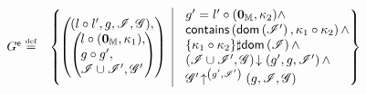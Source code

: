 %
%
%
\begin{definition}[Guarantee]
\[
\begin{array}{r l}

	\extendG \eqdef &
 	\left\{
 	\hspace*{-0.2cm}
	 \begin{array}{l | r}
	   \left(
	   \hspace*{-0.2cm}
	   \begin{array}{l}
	     (l \composeL l', g, \lmod, \gmod),\\
 	     \left(
	     \hspace*{-0.2cm}
	     \begin{array}{l}
	      l \composeL (\unitH, \ca{1}),\\
	      g \composeL g',\\
	      \lmod \cup \lmod', \gmod'
	     \end{array}
 	    \hspace*{-0.2cm}
 	    \right)
	   \end{array}
	   \hspace*{-0.2cm}
 	  \right)
	   &
 	  \begin{array}{l}
 	  	g' = l' \composeL (\unitH, \ca{2})  \land\\
 	  	\contains{\dom{\lmod'}}{\ca{1} \composeL \ca{2}} \land\\ 	  	
 	  	\{\ca{1} \composeL \ca{2}\} \disjoint \dom{\lmod}\land \\
			\extendsAM{\lmod \cup \lmod', \gmod}{g'}{g}{\lmod'} \land\\
			\expandsAM{\gmod'}{g'}{\lmod'}{g}{\lmod}{\gmod}

     	
   	\end{array}
   	\hspace*{-0.15cm}
 	\end{array}
 	\hspace*{-0.2cm}
	\right\}\\
	

\end{array}\]
\end{definition}
